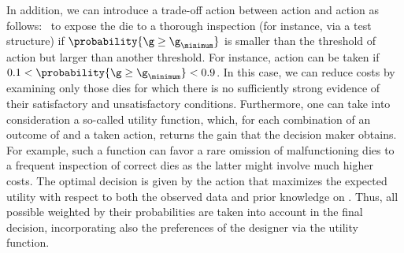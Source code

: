 In addition, we can introduce a trade-off action between action \one and action
\two as follows: \three~to expose the die to a thorough inspection (for
instance, via a test structure) if $\probability{\g \geq \g_\minimum}$ is
smaller than the threshold of action \one but larger than another threshold. For
instance, action \three can be taken if $0.1 < \probability{\g \geq \g_\minimum}
< 0.9$. In this case, we can reduce costs by examining only those dies for which
there is no sufficiently strong evidence of their satisfactory and
unsatisfactory conditions. Furthermore, one can take into consideration a
so-called utility function, which, for each combination of an outcome of \g and
a taken action, returns the gain that the decision maker obtains. For example,
such a function can favor a rare omission of malfunctioning dies to a frequent
inspection of correct dies as the latter might involve much higher costs. The
optimal decision is given by the action that maximizes the expected utility with
respect to both the observed data and prior knowledge on \g. Thus, all possible
\g weighted by their probabilities are taken into account in the final decision,
incorporating also the preferences of the designer via the utility function.
